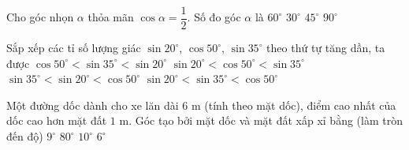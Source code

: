 

\begin{ex}%
	Cho góc nhọn $\alpha$ thỏa mãn $\cos\alpha=\dfrac12$. Số đo góc $\alpha$ là
	\choice
	{\True $60^\circ$}
	{$30^\circ$}
	{$45^\circ$}
	{$90^\circ$}
\end{ex}

\begin{ex}%
	Sắp xếp các tỉ số lượng giác $\sin 20^\circ$, $\cos 50^\circ$, $\sin 35^\circ$ theo thứ tự tăng dần, ta được
	\choice
	{$\cos 50^\circ<\sin 35^\circ<\sin 20^\circ$}
	{$\sin 20^\circ<\cos 50^\circ<\sin 35^\circ$}
	{$\sin 35^\circ<\sin 20^\circ<\cos 50^\circ$}
	{\True $\sin 20^\circ<\sin 35^\circ<\cos 50^\circ$}
\end{ex}

\begin{ex}%
	Một đường dốc dành cho xe lăn dài $6\text{ m}$ (tính theo mặt dốc), điểm cao nhất của dốc cao hơn mặt đất $1\text{ m}$. Góc tạo bởi mặt dốc và mặt đất xấp xỉ bằng (làm tròn đến độ)
	\choice
	{$9^\circ$}
	{$80^\circ$}
	{\True $10^\circ$}
	{$6^\circ$}
\end{ex}

